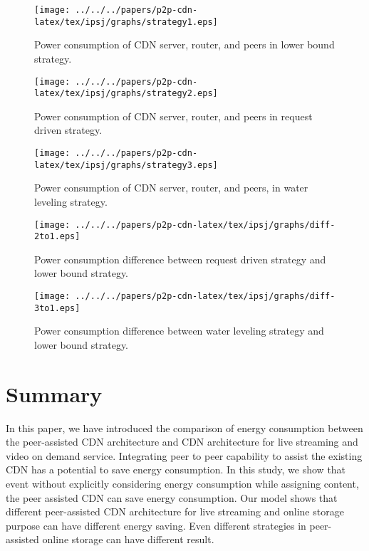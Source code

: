 \begin{figure*}[ht]
\centering
\begin{minipage}[b]{0.3\linewidth}
	\texttt{[image: ../../../papers/p2p-cdn-latex/tex/ipsj/graphs/strategy1.eps]}
	\caption{Power consumption of CDN server, router, and peers in lower bound strategy.}
	\label{fig:stg1}
\end{minipage}
\hfill
\centering
\begin{minipage}[b]{0.3\linewidth}
	\texttt{[image: ../../../papers/p2p-cdn-latex/tex/ipsj/graphs/strategy2.eps]}
	\caption{Power consumption of CDN server, router, and peers in request driven strategy.}
	\label{fig:stg2}
\end{minipage}
\hfill
\centering
\begin{minipage}[b]{0.3\linewidth}
	\texttt{[image: ../../../papers/p2p-cdn-latex/tex/ipsj/graphs/strategy3.eps]}
	\caption{Power consumption of CDN server, router, and peers, in water leveling strategy.}
	\label{fig:stg3}
\end{minipage}
\label{fig:storage}
\end{figure*}

\begin{figure*}[ht]
\centering
\begin{minipage}[b]{0.3\linewidth}
	\texttt{[image: ../../../papers/p2p-cdn-latex/tex/ipsj/graphs/diff-2to1.eps]}
	\caption{Power consumption difference between request driven strategy and lower bound strategy.}
	\label{fig:diff2to1}
\end{minipage}
\hfill
\centering
\begin{minipage}[b]{0.3\linewidth}
	\texttt{[image: ../../../papers/p2p-cdn-latex/tex/ipsj/graphs/diff-3to1.eps]}
	\caption{Power consumption difference between water leveling strategy and lower bound strategy.}
	\label{fig:diff3to1}
\end{minipage}
\label{fig:diffstrategy}
\end{figure*}

\section{Summary}\label{summary6}

In this paper, we have introduced the comparison of energy consumption between the peer-assisted CDN architecture and CDN architecture for live streaming and video on demand service.
Integrating peer to peer capability to assist the existing CDN has a potential to save energy consumption.
In this study, we show that event without explicitly considering energy consumption while assigning content, the peer assisted CDN can save energy consumption.
Our model shows that different peer-assisted CDN architecture for live streaming and online storage purpose can have different energy saving. 
Even different strategies in peer-assisted online storage can have different result.  

